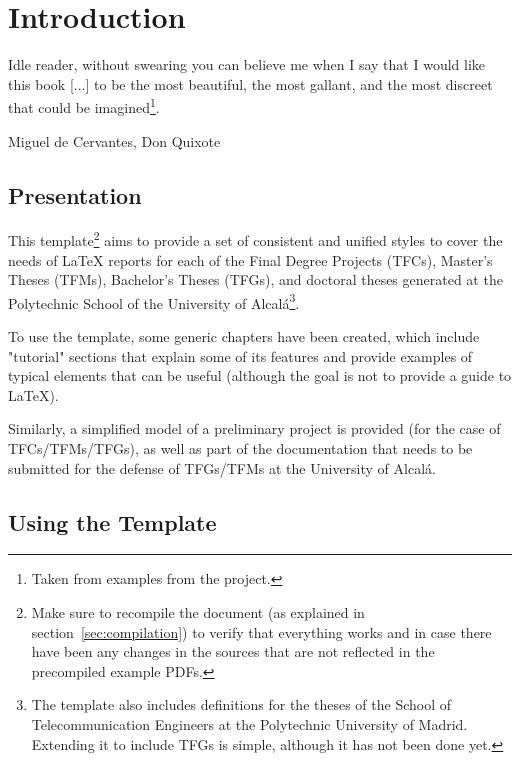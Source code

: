 {
  \chapter{Introduction}
  \label{cha:introduction}

  \begin{FamousQuote}
    \begin{Quote}
      Idle reader, without swearing you can believe me when I say that I would like this book [...] to be the most beautiful, the most gallant, and the most discreet that could be imagined\footnote{Taken from examples from the \texis{} project.}.
    \end{Quote}
    \begin{Source}
      Miguel de Cervantes, Don Quixote
    \end{Source}
  \end{FamousQuote}

  \section{Presentation}
  \label{sec:presentation}

  This template\footnote{Make sure to recompile the document (as explained in section~\ref{sec:compilation}) to verify that everything works and in case there have been any changes in the sources that are not reflected in the precompiled example PDFs.} aims to provide a set of consistent and unified styles to cover the needs of LaTeX reports for each of the Final Degree Projects (TFCs), Master's Theses (TFMs), Bachelor's Theses (TFGs), and doctoral theses generated at the Polytechnic School of the University of Alcalá\footnote{The template also includes definitions for the theses of the School of Telecommunication Engineers at the Polytechnic University of Madrid. Extending it to include TFGs is simple, although it has not been done yet.}.

  To use the template, some generic chapters have been created, which include "tutorial" sections that explain some of its features and provide examples of typical elements that can be useful (although the goal is not to provide a guide to LaTeX).

  Similarly, a simplified model of a preliminary project is provided (for the case of TFCs/TFMs/TFGs), as well as part of the documentation that needs to be submitted for the defense of TFGs/TFMs at the University of Alcalá.


  \section{Using the Template}
  \label{sec:using-the-template}

}
